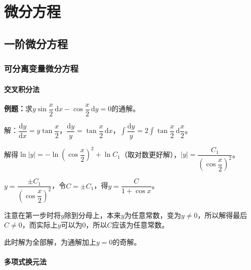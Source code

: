 \setcounter{tocdepth}{4}
\setcounter{secnumdepth}{4}
\renewcommand{\baselinestretch}{1.5}
\chapter{微分方程}

\section{一阶微分方程}

\subsection{可分离变量微分方程}

\subsubsection{交叉积分法}

\textbf{例题：}求$y\sin\dfrac{x}{2}\,\textrm{d}x-\cos\dfrac{x}{2}\,\textrm{d}y=0$的通解。

解：$\dfrac{\textrm{d}y}{\textrm{d}x}=y\tan\dfrac{x}{2}$，$\dfrac{\textrm{d}y}{y}=\tan\dfrac{x}{2}\,\textrm{d}x$，$\displaystyle{\int\dfrac{\textrm{d}y}{y}=2\int\tan\dfrac{x}{2}\,\textrm{d}\dfrac{x}{2}}$。

解得$\ln\vert y\vert=-\ln\left(\cos\dfrac{x}{2}\right)^2+\ln C_1$（取对数更好解），$\vert y\vert=\dfrac{C_1}{\left(\cos\dfrac{x}{2}\right)^2}$。

$y=\dfrac{\pm C_1}{\left(\cos\dfrac{x}{2}\right)^2}$，令$C=\pm C_1$，得$y=\dfrac{C}{1+\cos x}$。

注意在第一步时将$y$除到分母上，本来$y$为任意常数，变为$y\neq0$，所以解得最后$C\neq0$，而实际上$y$可以为0，所以$C$应该为任意常数。

此时解为全部解，为通解加上$y=0$的奇解。

\subsubsection{多项式换元法}

